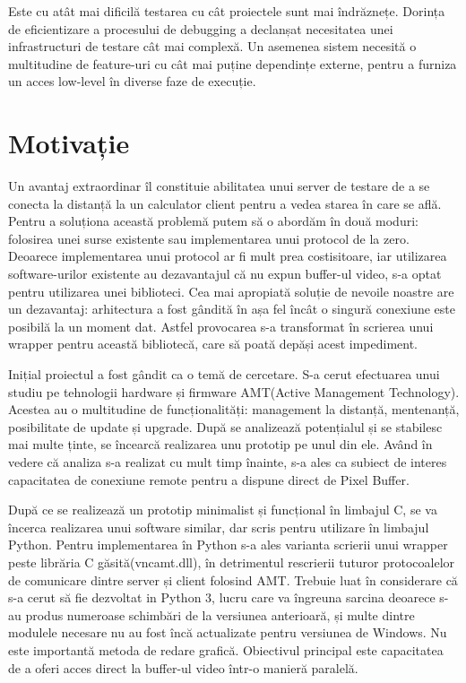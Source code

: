 Este cu atât mai dificilă testarea cu cât proiectele sunt mai îndrăznețe. Dorința de eficientizare a procesului de debugging a declanșat necesitatea unei infrastructuri de testare cât mai complexă. Un asemenea sistem necesită o multitudine de feature-uri cu cât mai puține dependințe externe, pentru a furniza un acces low-level în diverse faze de execuție.


\section{Motivație}
Un avantaj extraordinar îl constituie abilitatea unui server de testare de a se conecta la distanță la un calculator client pentru a vedea starea în care se află. Pentru a soluționa această problemă putem să o abordăm în două moduri: folosirea unei surse existente sau implementarea unui protocol de la zero. Deoarece implementarea unui protocol ar fi mult prea costisitoare, iar utilizarea software-urilor existente au dezavantajul că nu expun buffer-ul video, s-a optat pentru utilizarea unei biblioteci. Cea mai apropiată soluție de nevoile noastre are un dezavantaj: arhitectura a fost gândită în așa fel încât o singură conexiune este posibilă la un moment dat. Astfel provocarea s-a transformat în scrierea unui wrapper pentru această bibliotecă, care să poată depăși acest impediment.

Inițial proiectul a fost gândit ca o temă de cercetare. S-a cerut efectuarea unui studiu pe tehnologii hardware și firmware AMT(Active Management Technology). Acestea au o multitudine de funcționalități: management la distanță, mentenanță, posibilitate de update și upgrade. După se analizează potențialul și se stabilesc mai multe ținte, se încearcă realizarea unu prototip pe unul din ele. Având în vedere că analiza s-a realizat cu mult timp înainte, s-a ales ca subiect de interes capacitatea de conexiune remote pentru a dispune direct de Pixel Buffer. 

După ce se realizează un prototip minimalist și funcțional în limbajul C, se va încerca realizarea unui software similar, dar scris pentru utilizare în limbajul Python. Pentru implementarea în Python s-a ales varianta scrierii unui wrapper peste librăria C găsită(vncamt.dll), în detrimentul rescrierii tuturor protocoalelor de comunicare dintre server și client folosind AMT. Trebuie luat în considerare că s-a cerut să fie dezvoltat in Python 3, lucru care va îngreuna sarcina deoarece s-au produs numeroase schimbări de la versiunea anterioară, și multe dintre modulele necesare nu au fost încă actualizate pentru versiunea de Windows. Nu este importantă metoda de redare grafică. Obiectivul principal este capacitatea de a oferi acces direct la buffer-ul video într-o manieră paralelă.

